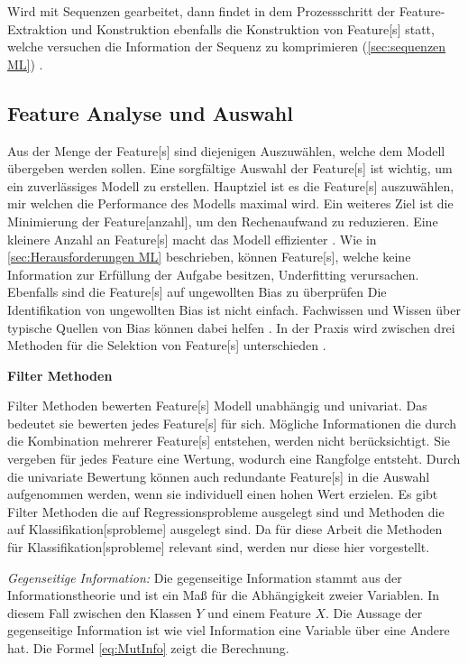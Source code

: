Wird mit Sequenzen gearbeitet, dann findet in dem Prozessschritt der \gls{Feature}-Extraktion und Konstruktion ebenfalls die Konstruktion von \gls{Feature}[s] statt, welche versuchen die Information der Sequenz zu komprimieren (\ref{sec:sequenzen ML}) \cite{Nielsen.2020}. 

\subsection{Feature Analyse und Auswahl} \label{sec:ML FeatSelect}
Aus der Menge der \gls{Feature}[s] sind diejenigen Auszuwählen, welche dem Modell übergeben werden sollen. Eine sorgfältige Auswahl der \gls{Feature}[s] ist wichtig, um ein zuverlässiges Modell zu erstellen. Hauptziel ist es die \gls{Feature}[s] auszuwählen, mir welchen die Performance des Modells maximal wird. Ein weiteres Ziel ist die Minimierung der \gls{Feature}[anzahl], um den Rechenaufwand zu reduzieren. Eine kleinere Anzahl an \gls{Feature}[s] macht das Modell effizienter \cite{Kuhn.2013, Guyon.2003}. Wie in \ref{sec:Herausforderungen ML} beschrieben, können \gls{Feature}[s], welche keine Information zur Erfüllung der Aufgabe besitzen, \gls{Underfitting} verursachen. Ebenfalls sind die \gls{Feature}[s] auf ungewollten \gls{Bias} zu überprüfen Die Identifikation von ungewollten \gls{Bias} ist nicht einfach. Fachwissen und Wissen über typische Quellen von \gls{Bias} können dabei helfen \cite{Mehrabi.2019, Nielsen.2020}. In der Praxis wird zwischen drei Methoden für die Selektion von \gls{Feature}[s] unterschieden \cite{Guyon.2003}. \dubpar

\textbf{\gls{Filter Methoden}}\par
\gls{Filter Methoden} bewerten \gls{Feature}[s] Modell unabhängig und univariat. Das bedeutet sie bewerten jedes \gls{Feature}[s] für sich. Mögliche Informationen die durch die Kombination mehrerer \gls{Feature}[s] entstehen, werden nicht berücksichtigt. Sie vergeben für jedes \gls{Feature} eine Wertung, wodurch eine Rangfolge entsteht. Durch die univariate Bewertung können auch redundante \gls{Feature}[s] in die Auswahl aufgenommen werden, wenn sie individuell einen hohen Wert erzielen. Es gibt \gls{Filter Methoden} die auf Regressionsprobleme ausgelegt sind und Methoden die auf \gls{Klassifikation}[sprobleme] ausgelegt sind. Da für diese Arbeit die Methoden für \gls{Klassifikation}[sprobleme] relevant sind, werden nur diese hier vorgestellt.\par

\textit{Gegenseitige Information:} Die gegenseitige Information stammt aus der Informationstheorie und ist ein Maß für die Abhängigkeit zweier Variablen. In diesem Fall zwischen den Klassen \(Y\) und einem \gls{Feature} \(X\). Die Aussage der gegenseitige Information ist wie viel Information eine Variable über eine Andere hat. Die Formel \ref{eq:MutInfo} zeigt die Berechnung. 

